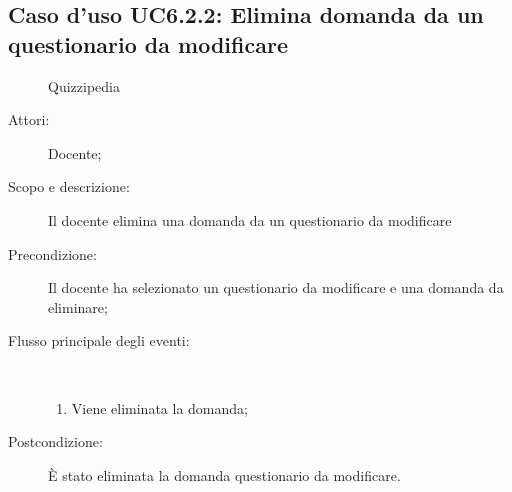\subsection{Caso d'uso UC6.2.2: Elimina domanda da un questionario da  modificare}
	\begin{figure}[H]
		\centering
		\begin{resizedtikzpicture}{\textwidth}
		\begin{umlsystem}[x=0, fill=lightgray!20]{Quizzipedia}
		\end{umlsystem}
		\end{resizedtikzpicture}
		\caption{}
	\end{figure}
\begin{description}
\item[Attori:] Docente;
\item[Scopo e descrizione:] Il docente elimina una domanda da un questionario da modificare
      \item[Precondizione:] Il docente ha selezionato un questionario da modificare e una domanda da eliminare;

        \item[Flusso principale degli eventi:] \ 
 \begin{enumerate}
          \item Viene eliminata la domanda;

      \end{enumerate}
    \item[Postcondizione:] È stato eliminata la domanda questionario da modificare.
  \end{description}
\hypertarget{UC6.2.3}{}
